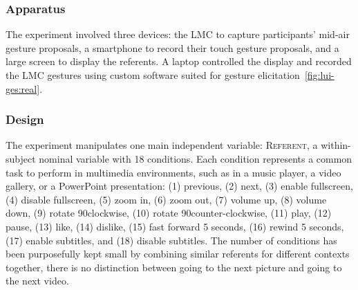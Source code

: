 \subsubsection{Apparatus}
The experiment involved three devices: the LMC to capture participants' mid-air gesture proposals, a smartphone to record their touch gesture proposals, and a large screen to display the referents. %
A laptop controlled the display and recorded the LMC gestures using custom software suited for gesture elicitation~\ref{fig:lui-ges:real}.


\subsubsection{Design} 
The experiment manipulates one main independent variable:
\textsc{Referent}, a within-subject nominal variable with 18 conditions. Each condition represents a common task to perform in multimedia environments, such as in a music player, a video gallery, or a PowerPoint presentation: (1) previous, (2) next, (3) enable fullscreen, (4) disable fullscreen, (5) zoom in, (6) zoom out, (7) volume up, (8) volume down, (9) rotate 90\textdegree clockwise, (10) rotate 90\textdegree counter-clockwise, (11) play, (12) pause, (13) like, (14) dislike, (15) fast forward 5 seconds, (16) rewind 5 seconds, (17) enable subtitles, and (18) disable subtitles. The number of conditions has been purposefully kept small by combining similar referents for different contexts together, \eg there is no distinction between going to the next picture and going to the next video.

